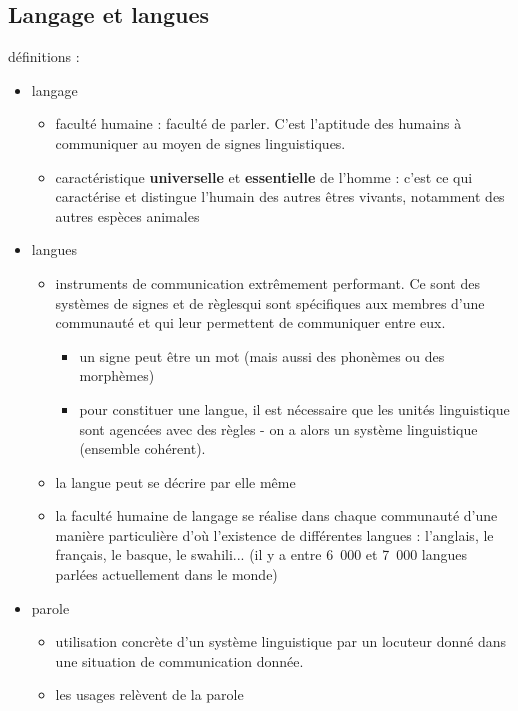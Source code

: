 \subsection{Langage et langues}
définitions : 
\begin{itemize}
   \item  langage
      \begin{itemize} 
         \item faculté humaine : faculté de parler. C'est l'aptitude des humains à communiquer au moyen de signes linguistiques.
         \item caractéristique \textbf{universelle} et \textbf{essentielle} de l'homme : c'est ce qui caractérise et distingue l'humain des autres êtres vivants, notamment des autres espèces animales
      \end{itemize}
   \item langues
      \begin{itemize} 
         \item instruments de communication extrêmement performant. Ce sont des systèmes de signes et de règlesqui sont spécifiques aux membres d'une communauté et qui leur permettent de communiquer entre eux.
            \begin{itemize} 
               \item un signe peut être un mot (mais aussi des phonèmes ou des morphèmes)
               \item pour constituer une langue, il est nécessaire que les unités linguistique sont agencées avec des règles - on a alors un système linguistique (ensemble cohérent).
            \end{itemize}
         \item la langue peut se décrire par elle même 
         \item la faculté humaine de langage se réalise dans chaque communauté d'une manière particulière d'où l'existence de différentes langues : l'anglais, le français, le basque, le swahili... (il y a entre 6~000 et 7~000 langues parlées actuellement dans le monde)
      \end{itemize}
   \item parole 
      \begin{itemize} 
         \item  utilisation concrète d'un système linguistique par un locuteur donné dans une situation de communication donnée.
         \item  les usages relèvent de la parole
      \end{itemize}
\end{itemize}

